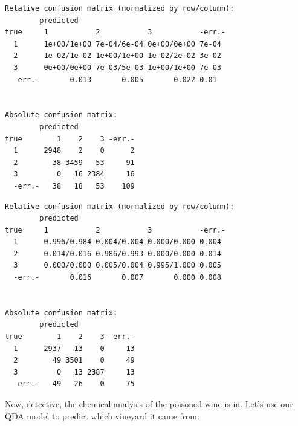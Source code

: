 \documentclass[
]{article}
\newenvironment{Shaded}{\begin{snugshade}}{\end{snugshade}}
\newcommand{\AttributeTok}[1]{\textcolor[rgb]{0.13,0.29,0.53}{#1}}
\newcommand{\ConstantTok}[1]{\textcolor[rgb]{0.56,0.35,0.01}{#1}}
\newcommand{\FunctionTok}[1]{\textcolor[rgb]{0.13,0.29,0.53}{\textbf{#1}}}
\newcommand{\NormalTok}[1]{#1}
\newcommand{\SpecialCharTok}[1]{\textcolor[rgb]{0.81,0.36,0.00}{\textbf{#1}}}
\begin{document}
\begin{Shaded}
\end{Shaded}

\begin{verbatim}
Relative confusion matrix (normalized by row/column):
        predicted
true     1           2           3           -err.-     
  1      1e+00/1e+00 7e-04/6e-04 0e+00/0e+00 7e-04      
  2      1e-02/1e-02 1e+00/1e+00 1e-02/2e-02 3e-02      
  3      0e+00/0e+00 7e-03/5e-03 1e+00/1e+00 7e-03      
  -err.-       0.013       0.005       0.022 0.01       


Absolute confusion matrix:
        predicted
true        1    2    3 -err.-
  1      2948    2    0      2
  2        38 3459   53     91
  3         0   16 2384     16
  -err.-   38   18   53    109
\end{verbatim}

\begin{Shaded}
\end{Shaded}

\begin{verbatim}
Relative confusion matrix (normalized by row/column):
        predicted
true     1           2           3           -err.-     
  1      0.996/0.984 0.004/0.004 0.000/0.000 0.004      
  2      0.014/0.016 0.986/0.993 0.000/0.000 0.014      
  3      0.000/0.000 0.005/0.004 0.995/1.000 0.005      
  -err.-       0.016       0.007       0.000 0.008      


Absolute confusion matrix:
        predicted
true        1    2    3 -err.-
  1      2937   13    0     13
  2        49 3501    0     49
  3         0   13 2387     13
  -err.-   49   26    0     75
\end{verbatim}

Now, detective, the chemical analysis of the poisoned wine is in. Let's
use our QDA model to predict which vineyard it came from:
\end{document}
